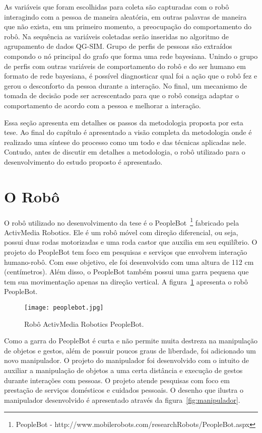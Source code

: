As variáveis que foram escolhidas para coleta são capturadas com o robô interagindo com a pessoa de maneira aleatória, em outras palavras de maneira que não exista, em um primeiro momento, a preocupação do comportamento do robô. Na sequência as variáveis coletadas serão inseridas no algoritmo de agrupamento de dados QG-SIM. Grupo de perfis de pessoas são extraídos compondo o nó principal do grafo que forma uma rede bayesiana. Unindo o grupo de perfis com outras variáveis de comportamento do robô e do ser humano em formato de rede bayesiana, é possível diagnosticar qual foi a ação que o robô fez e gerou o desconforto da pessoa durante a interação. No final, um mecanismo de tomada de decisão pode ser acrescentado para que o robô consiga adaptar o comportamento de acordo com a pessoa e melhorar a interação.

Essa seção apresenta em detalhes os passos da metodologia proposta por esta tese. Ao final do capítulo é apresentado a visão completa da metodologia onde é realizado uma síntese do processo como um todo e das técnicas aplicadas nele. Contudo, antes de discutir em detalhes a metodologia, o robô utilizado para o desenvolvimento do estudo proposto é apresentado.

\section{O Robô}
\label{sec:robo}
O robô utilizado no desenvolvimento da tese é o PeopleBot~\footnote{PeopleBot - http://www.mobilerobots.com/researchRobots/PeopleBot.aspx} fabricado pela ActivMedia Robotics. Ele é um robô móvel com direção diferencial, ou seja, possui duas rodas motorizadas e uma roda castor que auxilia em seu equilíbrio. O projeto do PeopleBot tem foco em pesquisas e serviços que envolvem interação humano-robô. Com esse objetivo, ele foi desenvolvido com uma altura de 112 cm (centímetros). Além disso, o PeopleBot também possui uma garra pequena que tem sua movimentação apenas na direção vertical. A figura~\ref{fig:peoplebot} apresenta o robô PeopleBot.

\begin{figure}[ht!]
	\centering
	\begin{minipage}{\textwidth}
		\caption{Robô ActivMedia Robotics PeopleBot.}
		\texttt{[image: peoplebot.jpg]}
		\label{fig:peoplebot}
	\end{minipage}
\end{figure}

Como a garra do PeopleBot é curta e não permite muita destreza na manipulação de objetos e gestos, além de possuir poucos graus de liberdade, foi adicionado um novo manipulador. O projeto do manipulador foi desenvolvido com o intuito de auxiliar a manipulação de objetos a uma certa distância e execução de gestos durante interações com pessoas. O projeto atende pesquisas com foco em prestação de serviços domésticos e cuidados pessoais. O desenho que ilustra o manipulador desenvolvido é apresentado através da figura~\ref{fig:manipulador}.

